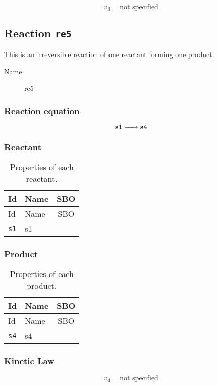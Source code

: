 \documentclass[11pt,twoside,a4paper]{scrartcl}
\newcommand{\reaction}[1]{\begin{equation}\ce{#1}\end{equation}}
\begin{document}
\begin{dmath}
v_{3}=\text{not specified}
\label{v3}
\end{dmath}

\subsection{Reaction \texttt{re5}}
This is an irreversible reaction of one reactant forming one product.\begin{description}
\item[Name] re5
\end{description}

\subsubsection*{Reaction equation}
\reaction{ $\mathtt{s1}$ ->  $\mathtt{s4}$}

\subsubsection*{Reactant}
\begin{longtable}[h!]{llc}
\caption{Properties of each reactant.}\\
\toprule
Id & Name & SBO\\
\midrule
\endfirsthead
\toprule
Id & Name & SBO\\
\midrule
\endhead
\texttt{s1}&s1&\\
\bottomrule\end{longtable}

\subsubsection*{Product}
\begin{longtable}[h!]{llc}
\caption{Properties of each product.}\\
\toprule
Id & Name & SBO\\
\midrule
\endfirsthead
\toprule
Id & Name & SBO\\
\midrule
\endhead
\texttt{s4}&s4&\\
\bottomrule\end{longtable}

\subsubsection*{Kinetic Law}

\begin{dmath}
v_{4}=\text{not specified}
\label{v4}
\end{dmath}
\end{document}
